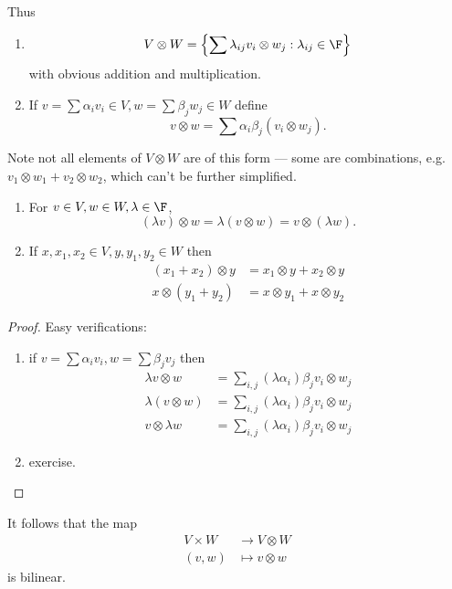 \documentclass[a4paper]{article}
\theoremstyle{definition}
\begin{document}
Thus
\begin{enumerate}
\item
  \[
    V \otimes W = \left\{\sum \lambda_{ij} v_i \otimes w_j: \lambda_{ij} \in \F \right\}
  \]
  with obvious addition and multiplication.
\item If \(v = \sum \alpha_i v_i \in V, w = \sum \beta_j w_j \in W\) define
  \[
    v \otimes w = \sum \alpha_i \beta_j (v_i \otimes w_j).
  \]
\end{enumerate}

\begin{remark}
  Note not all elements of \(V \otimes W\) are of this form --- some are combinations, e.g.\ \(v_1 \otimes w_1 + v_2 \otimes w_2\), which can't be further simplified.
\end{remark}

\begin{lemma}\leavevmode
  \begin{enumerate}
  \item For \(v \in V, w \in W, \lambda \in \F\),
    \[
      (\lambda v) \otimes w = \lambda (v \otimes w) = v \otimes (\lambda w).
    \]
  \item If \(x, x_1, x_2 \in V, y, y_1, y_2 \in W\) then
    \begin{align*}
      (x_1 + x_2) \otimes y &= x_1 \otimes y + x_2 \otimes y \\
      x \otimes (y_1 + y_2) &= x \otimes y_1 + x \otimes y_2
    \end{align*}
  \end{enumerate}
\end{lemma}

\begin{proof}
  Easy verifications:
  \begin{enumerate}
  \item if \(v = \sum \alpha_i v_i, w = \sum \beta_j v_j\) then
    \begin{align*}
      \lambda v \otimes w &= \sum_{i, j} (\lambda \alpha_i) \beta_j v_i \otimes w_j \\
      \lambda (v \otimes w) &= \sum_{i, j} (\lambda \alpha_i) \beta_j v_i \otimes w_j \\
      v \otimes \lambda w &= \sum_{i, j} (\lambda \alpha_i) \beta_j v_i \otimes w_j
    \end{align*}
  \item exercise.
  \end{enumerate}
\end{proof}

It follows that the map
\begin{align*}
  V \times W &\to V \otimes W \\
  (v, w) &\mapsto v \otimes w
\end{align*}
is bilinear.
\end{document}
